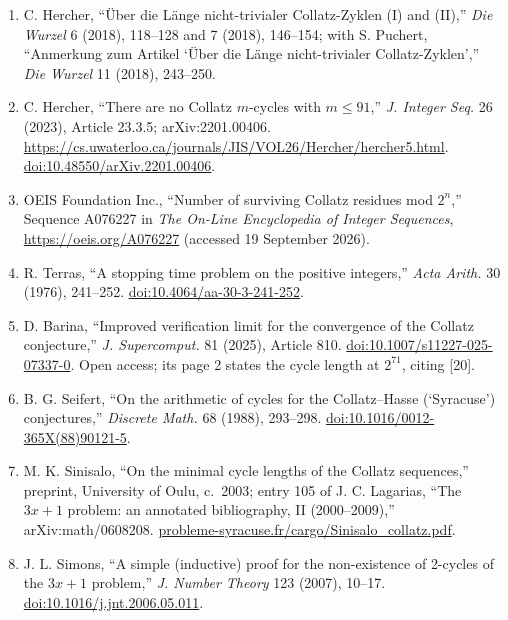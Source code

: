 \documentclass[12pt]{article}
\begin{document}
\begin{enumerate}
{  Math. IH\'{E}S} 49 (1979), 5--233, Theorem 3.1, p.~73.
  \href{https://doi.org/10.1007/BF02684798}{doi:10.1007/BF02684798}.
\item
  C. Hercher, ``\"{U}ber die L\"{a}nge nicht-trivialer Collatz-Zyklen
  (I) and (II),'' \emph{Die Wurzel} 6 (2018), 118--128 and 7 (2018),
  146--154; with S. Puchert, ``Anmerkung zum Artikel `\"{U}ber die
  L\"{a}nge nicht-trivialer Collatz-Zyklen','' \emph{Die Wurzel} 11
  (2018), 243--250.
\item
  C. Hercher, ``There are no Collatz \(m\)-cycles with \(m\le 91\),''
  \emph{J. Integer Seq.} 26 (2023), Article 23.3.5; arXiv:2201.00406.
  \url{https://cs.uwaterloo.ca/journals/JIS/VOL26/Hercher/hercher5.html}.
  \href{https://doi.org/10.48550/arXiv.2201.00406}{doi:10.48550/arXiv.2201.00406}.
\item
  OEIS Foundation Inc., ``Number of surviving Collatz residues mod
  \(2^n\),'' Sequence A076227 in \emph{The On-Line Encyclopedia of
  Integer Sequences}, \url{https://oeis.org/A076227} (accessed 19
  September 2026).
\item
  R. Terras, ``A stopping time problem on the positive integers,''
  \emph{Acta Arith.} 30 (1976), 241--252.
  \href{https://doi.org/10.4064/aa-30-3-241-252}{doi:10.4064/aa-30-3-241-252}.
\item
  D. Barina, ``Improved verification limit for the convergence of the
  Collatz conjecture,'' \emph{J. Supercomput.} 81 (2025), Article 810.
  \href{https://doi.org/10.1007/s11227-025-07337-0}{doi:10.1007/s11227-025-07337-0}.
  Open access; its page 2 states the cycle length at \(2^{71}\), citing
  {[}20{]}.
\item
  B. G. Seifert, ``On the arithmetic of cycles for the Collatz--Hasse
  (`Syracuse') conjectures,'' \emph{Discrete Math.} 68 (1988), 293--298.
  \href{https://doi.org/10.1016/0012-365X(88)90121-5}{doi:10.1016/0012-365X(88)90121-5}.
\item
  M. K. Sinisalo, ``On the minimal cycle lengths of the Collatz
  sequences,'' preprint, University of Oulu, c.~2003; entry 105 of J. C.
  Lagarias, ``The \(3x+1\) problem: an annotated bibliography, II
  (2000--2009),'' arXiv:math/0608208.
  \href{https://www.probleme-syracuse.fr/cargo/Sinisalo_collatz.pdf}{probleme-syracuse.fr/cargo/Sinisalo\_collatz.pdf}.
\item
  J. L. Simons, ``A simple (inductive) proof for the non-existence of
  2-cycles of the \(3x+1\) problem,'' \emph{J. Number Theory} 123
  (2007), 10--17.
  \href{https://doi.org/10.1016/j.jnt.2006.05.011}{doi:10.1016/j.jnt.2006.05.011}.

\end{enumerate}
\end{document}
